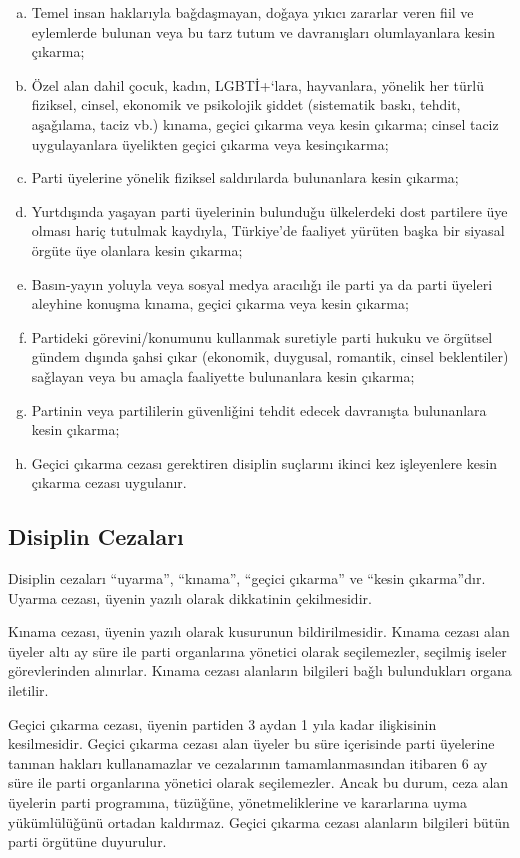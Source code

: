 \documentclass[11pt]{article} %
\begin{document}
\begin{enumerate}[a)]
\item Temel insan haklarıyla baǧdaşmayan, doǧaya yıkıcı zararlar veren fiil ve eylemlerde bulunan veya bu tarz tutum ve davranışları olumlayanlara kesin çıkarma;
\item Özel alan dahil çocuk, kadın, LGBTİ+‘lara, hayvanlara, yönelik her türlü fiziksel, cinsel, ekonomik ve psikolojik şiddet (sistematik baskı, tehdit, aşaǧılama, taciz vb.) kınama, geçici çıkarma veya kesin çıkarma; cinsel taciz uygulayanlara üyelikten geçici çıkarma veya kesinçıkarma;
\item Parti üyelerine yönelik fiziksel saldırılarda bulunanlara kesin çıkarma;
\item Yurtdışında yaşayan parti üyelerinin bulunduǧu ülkelerdeki dost partilere üye olması hariç tutulmak kaydıyla, Türkiye’de faaliyet yürüten başka bir siyasal örgüte üye olanlara kesin çıkarma;
\item Basın-yayın yoluyla veya sosyal medya aracılıǧı ile parti ya da parti üyeleri
aleyhine konuşma kınama, geçici çıkarma veya kesin çıkarma;
\item Partideki görevini/konumunu kullanmak suretiyle parti hukuku ve örgütsel gündem dışında şahsi çıkar (ekonomik, duygusal, romantik, cinsel beklentiler) saǧlayan veya bu amaçla faaliyette bulunanlara kesin çıkarma;
\item Partinin veya partililerin güvenliǧini tehdit edecek  davranışta  bulunanlara
kesin çıkarma;
\item Geçici çıkarma cezası gerektiren disiplin suçlarını ikinci kez işleyenlere kesin
çıkarma cezası uygulanır.
\end{enumerate}
\subsection{Disiplin Cezaları}
Disiplin cezaları “uyarma”, “kınama”, “geçici çıkarma” ve “kesin çıkarma”dır. Uyarma cezası, üyenin yazılı olarak dikkatinin çekilmesidir.

Kınama cezası, üyenin yazılı olarak kusurunun bildirilmesidir. Kınama cezası alan üyeler altı ay süre ile parti organlarına yönetici olarak seçilemezler, seçilmiş iseler görevlerinden alınırlar. Kınama cezası alanların bilgileri baǧlı bulundukları organa iletilir.

Geçici çıkarma cezası, üyenin partiden 3 aydan 1 yıla kadar ilişkisinin kesilmesidir. Geçici çıkarma cezası alan üyeler bu süre içerisinde parti üyelerine tanınan hakları kullanamazlar ve cezalarının tamamlanmasından itibaren 6 ay süre ile parti organlarına yönetici olarak seçilemezler. Ancak bu durum, ceza alan üyelerin parti programına, tüzüǧüne, yönetmeliklerine ve kararlarına uyma yükümlülüǧünü ortadan kaldırmaz. Geçici çıkarma cezası alanların bilgileri bütün parti örgütüne duyurulur.
\end{document}
